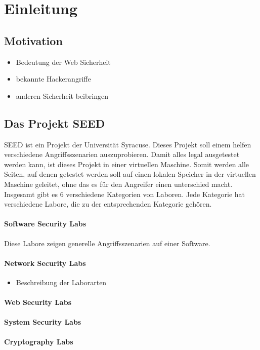 \chapter{Einleitung}
\section{Motivation}
\begin{itemize}
	\item Bedeutung der Web Sicherheit
	\item bekannte Hackerangriffe
	\item anderen Sicherheit beibringen
\end{itemize}

\section{Das Projekt SEED}
SEED ist ein Projekt der Universität Syracuse. Dieses Projekt soll einem helfen verschiedene Angriffsszenarien auszuprobieren. Damit alles legal ausgetestet werden kann, ist dieses Projekt in einer virtuellen Maschine. Somit werden alle Seiten, auf denen getestet werden soll auf einen lokalen Speicher in der virtuellen Maschine geleitet, ohne das es für den Angreifer einen unterschied macht. \\
Insgesamt gibt es 6 verschiedene Kategorien von Laboren. Jede Kategorie hat verschiedene Labore, die zu der entsprechenden Kategorie gehören.
\subsubsection{Software Security Labs}
Diese Labore zeigen generelle Angriffsszenarien auf einer Software. 
\subsubsection{Network Security Labs}
\begin{itemize}
	\item Beschreibung der Laborarten
\end{itemize}
\subsubsection{Web Security Labs}
\subsubsection{System Security Labs}
\subsubsection{Cryptography Labs}

